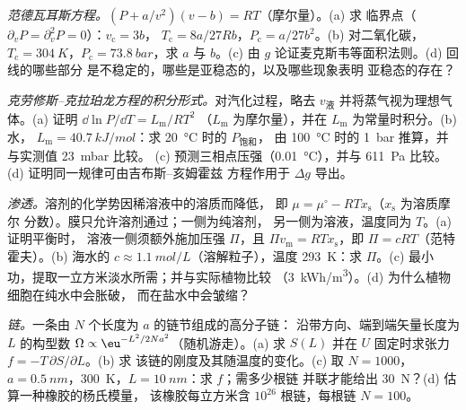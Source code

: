 \begin{exercise}[$\star\star$]\label{exo:b2:thermodynamic-potentials:9}
\emph{范德瓦耳斯方程。}$(P + a/v^2)(v - b) = RT$（摩尔量）。(a) 求
临界点（$\partial_vP = \partial_v^2P = 0$）：$v_{\text{c}} = 3b$，
$T_{\text{c}} = 8a/27Rb$，$P_{\text{c}} = a/27b^2$。(b) 对二氧化碳，
$T_{\text{c}} = \qty{304}{K}$，$P_{\text{c}} = \qty{73.8}{bar}$，求 $a$ 与 $b$。(c)
由 $g$ 论证麦克斯韦等面积法则。(d) 回线的哪些部分
是不稳定的，哪些是亚稳态的，以及哪些现象表明
亚稳态的存在？
\end{exercise}

\begin{exercise}[$\star\star\star$]\label{exo:b2:thermodynamic-potentials:10}
\emph{克劳修斯–克拉珀龙方程的积分形式。}对汽化过程，略去 $v_{\text{液}}$
并将蒸气视为理想气体。(a) 证明 $\dd\ln P/\dd T = L_{\text{m}}/RT^2$
（$L_{\text{m}}$ 为摩尔量），并在 $L_{\text{m}}$ 为常量时积分。(b) 水，
$L_{\text{m}} = \qty{40.7}{kJ/mol}$：求 \qty{20}{\celsius} 时的 $P_{\text{饱和}}$，
由 \qty{100}{\celsius} 时的 \qty{1}{bar} 推算，并与实测值 \qty{23}{mbar} 比较。
(c) 预测三相点压强（\qty{0.01}{\celsius}），并与
\qty{611}{Pa} 比较。(d) 证明同一规律可由吉布斯–亥姆霍兹
方程作用于 $\Delta g$ 导出。
\end{exercise}

\begin{exercise}[$\star\star\star$]\label{exo:b2:thermodynamic-potentials:11}
\emph{渗透。}溶剂的化学势因稀溶液中的溶质而降低，
即 $\mu = \mu^\circ - RTx_{\text{s}}$（$x_{\text{s}}$ 为溶质摩尔
分数）。膜只允许溶剂通过；一侧为纯溶剂，
另一侧为溶液，温度同为 $T$。(a) 证明平衡时，
溶液一侧须额外施加压强 $\Pi$，且 $\Pi v_{\text{m}} =
RTx_{\text{s}}$，即 $\Pi = cRT$（范特霍夫）。(b) 海水的 $c \approx
\qty{1.1}{mol/L}$（溶解粒子），温度 \qty{293}{K}：求 $\Pi$。(c) 最小
功，提取一立方米淡水所需；并与实际植物比较
（\qty{3}{kWh/m^3}）。(d) 为什么植物细胞在纯水中会胀破，
而在盐水中会皱缩？
\end{exercise}

\begin{exercise}[$\star\star\star$]\label{exo:b2:thermodynamic-potentials:12}
\emph{链。}一条由 $N$ 个长度为 $a$ 的链节组成的高分子链：
沿带方向、端到端矢量长度为 $L$ 的构型数
$\Omega \propto \eu^{-L^2/2Na^2}$（随机游走）。(a) 求 $S(L)$
并在 $U$ 固定时求张力 $f = -T\,\partial S/\partial L$。(b) 求
该链的刚度及其随温度的变化。(c) 取 $N = 1000$，$a =
\qty{0.5}{nm}$，\qty{300}{K}，$L = \qty{10}{nm}$：求 $f$；需多少根链
并联才能给出 \qty{30}{N}？(d) 估算一种橡胶的杨氏模量，
该橡胶每立方米含 $10^{26}$ 根链，每根链 $N = 100$。
\end{exercise}

